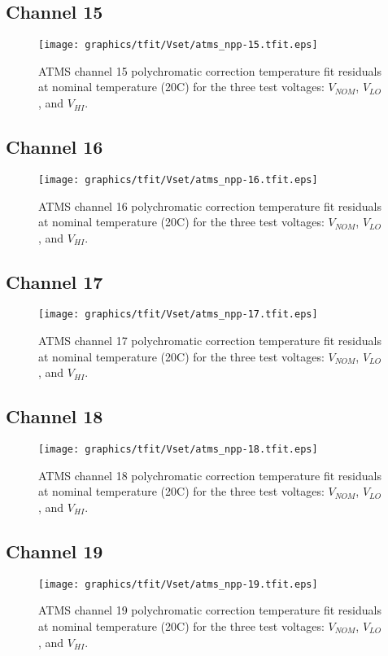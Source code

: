 \subsection{Channel 15}
\begin{figure}[H]
  \label{fig:Vset.ch15_tfit}
  \centering
  \texttt{[image: graphics/tfit/Vset/atms\_npp-15.tfit.eps]}
  \caption{ATMS channel 15 polychromatic correction temperature fit residuals at nominal temperature (20\textdegree{}C) for the three test voltages: $V_{NOM}$, $V_{LO}$, and $V_{HI}$.}
\end{figure}

\subsection{Channel 16}
\begin{figure}[H]
  \label{fig:Vset.ch16_tfit}
  \centering
  \texttt{[image: graphics/tfit/Vset/atms\_npp-16.tfit.eps]}
  \caption{ATMS channel 16 polychromatic correction temperature fit residuals at nominal temperature (20\textdegree{}C) for the three test voltages: $V_{NOM}$, $V_{LO}$, and $V_{HI}$.}
\end{figure}

\subsection{Channel 17}
\begin{figure}[H]
  \label{fig:Vset.ch17_tfit}
  \centering
  \texttt{[image: graphics/tfit/Vset/atms\_npp-17.tfit.eps]}
  \caption{ATMS channel 17 polychromatic correction temperature fit residuals at nominal temperature (20\textdegree{}C) for the three test voltages: $V_{NOM}$, $V_{LO}$, and $V_{HI}$.}
\end{figure}

\subsection{Channel 18}
\begin{figure}[H]
  \label{fig:Vset.ch18_tfit}
  \centering
  \texttt{[image: graphics/tfit/Vset/atms\_npp-18.tfit.eps]}
  \caption{ATMS channel 18 polychromatic correction temperature fit residuals at nominal temperature (20\textdegree{}C) for the three test voltages: $V_{NOM}$, $V_{LO}$, and $V_{HI}$.}
\end{figure}

\subsection{Channel 19}
\begin{figure}[H]
  \label{fig:Vset.ch19_tfit}
  \centering
  \texttt{[image: graphics/tfit/Vset/atms\_npp-19.tfit.eps]}
  \caption{ATMS channel 19 polychromatic correction temperature fit residuals at nominal temperature (20\textdegree{}C) for the three test voltages: $V_{NOM}$, $V_{LO}$, and $V_{HI}$.}
\end{figure}

